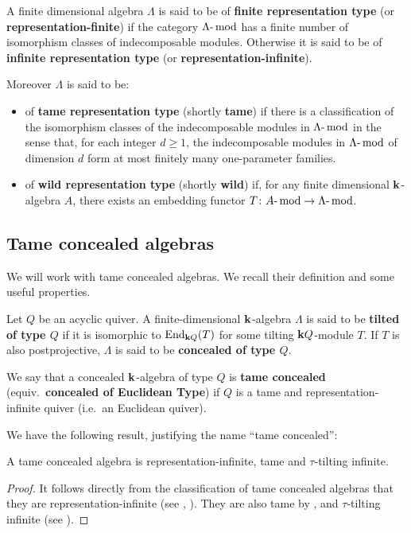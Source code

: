 \begin{definition}\cite{sim:vol1,sim:vol3}
	A finite dimensional algebra $\Lambda$ is said to be of \textbf{finite representation type} (or \textbf{representation-finite}) if the category $\Lambda\text{-}\operatorname{mod}$ has a finite number of isomorphism classes of indecomposable modules. Otherwise it is said to be of \textbf{infinite representation type} (or \textbf{representation-infinite}).\smallskip
	
	Moreover $\Lambda$ is said to be:
	\begin{itemize}
		\item of \textbf{tame representation type} (shortly \textbf{tame}) if there is a classification of the isomorphism classes of the indecomposable modules in $\Lambda\text{-}\operatorname{mod}$ in the sense
		that, for each integer $d \geq 1$, the indecomposable modules in $\Lambda\text{-}\operatorname{mod}$ of dimension $d$ form at most finitely many one-parameter families.
		\item of \textbf{wild representation type} (shortly \textbf{wild}) if, for any finite dimensional $\mathbf{k}$-algebra $A$, there exists an embedding functor $T\colon A\text{-}\operatorname{mod}\to \Lambda\text{-}\operatorname{mod}$.
	\end{itemize}
\end{definition}


\subsection{Tame concealed algebras}
We will work with tame concealed algebras. We recall their definition and some useful properties.

\begin{definition}
	Let $Q$ be an acyclic quiver. A finite-dimensional $\mathbf{k}$-algebra $\Lambda$ is said to be \textbf{tilted of type $Q$} if it is isomorphic to $\operatorname{End}_{\mathbf{k} Q}(T)$ for some tilting $\mathbf{k} Q$-module $T$. If $T$ is also postprojective, $\Lambda$ is said to be \textbf{concealed of type $Q$}.
	
	We say that a concealed $\mathbf{k}$-algebra of type $Q$ is \textbf{tame concealed} (equiv.~\textbf{concealed of Euclidean Type}) if $Q$ is a tame and representation-infinite quiver (i.e.~an Euclidean quiver).
\end{definition}

We have the following result, justifying the name ``tame concealed'':
\begin{theorem}\label{thm:tameconcealed}
	A tame concealed algebra is representation-infinite, tame and $\tau$-tilting infinite.
\end{theorem}
\begin{proof}
	It follows directly from the classification of tame concealed algebras that they are representation-infinite (see \cite[Theorem 1]{hap:min}, \cite[Section 4.3, Proposition 7]{ringel2006tame}). They are also tame by \cite[Ch.XIX, Theorem 3.14]{sim:vol3}, and $\tau$-tilting infinite (see \cite[Lemma 2.6]{borve:tau}).
\end{proof}


